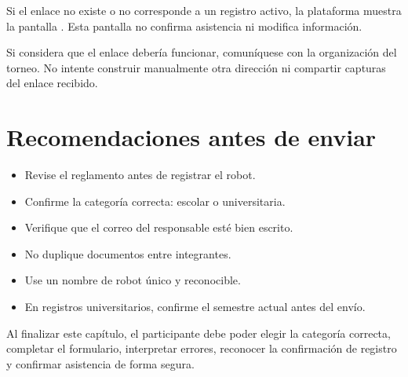 Si el enlace no existe o no corresponde a un registro activo, la plataforma muestra la pantalla . Esta pantalla no confirma asistencia ni modifica información.


\begin{fallas}
Si considera que el enlace debería funcionar, comuníquese con la organización del torneo. No intente construir manualmente otra dirección ni compartir capturas del enlace recibido.
\end{fallas}

\section{Recomendaciones antes de enviar}

\begin{itemize}
    \item Revise el reglamento antes de registrar el robot.
    \item Confirme la categoría correcta: escolar o universitaria.
    \item Verifique que el correo del responsable esté bien escrito.
    \item No duplique documentos entre integrantes.
    \item Use un nombre de robot único y reconocible.
    \item En registros universitarios, confirme el semestre actual antes del envío.
\end{itemize}

\begin{resultadoesperado}
Al finalizar este capítulo, el participante debe poder elegir la categoría correcta, completar el formulario, interpretar errores, reconocer la confirmación de registro y confirmar asistencia de forma segura.
\end{resultadoesperado}
